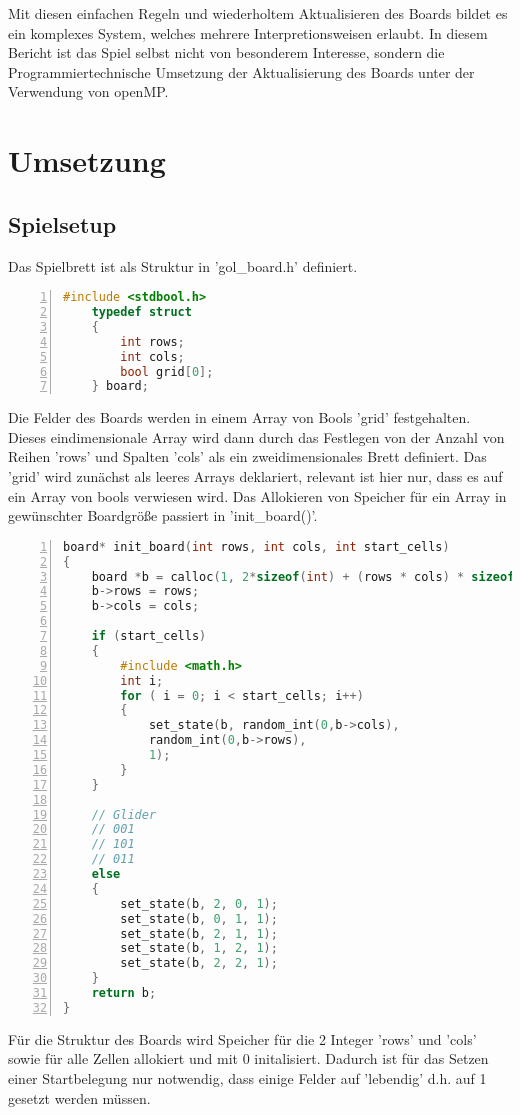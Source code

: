 \documentclass[plainarticle,zihtitle,german,final,hyperref,utf8]{zihpub}
\begin{document}
 
 Mit diesen einfachen Regeln und wiederholtem Aktualisieren des Boards bildet es ein komplexes System, welches mehrere Interpretionsweisen erlaubt.\cite{conwaysgame_wiki}\newline
 In diesem Bericht ist das Spiel selbst nicht von besonderem Interesse, sondern die Programmiertechnische Umsetzung der Aktualisierung des Boards unter der Verwendung von openMP.
 
\section{Umsetzung}
\subsection{Spielsetup}
Das Spielbrett ist als Struktur in 'gol\_board.h' definiert.
\begin{lstlisting}[language=c, numbers=left]
	#include <stdbool.h>
	typedef struct
	{
		int rows;
		int cols;
		bool grid[0];
	} board;
\end{lstlisting}
Die Felder des Boards werden in einem Array von Bools 'grid' festgehalten. Dieses eindimensionale Array wird dann durch das Festlegen von der Anzahl von Reihen 'rows' und Spalten 'cols' als ein zweidimensionales Brett definiert.\newline
Das 'grid' wird zunächst als leeres Arrays deklariert, relevant ist hier nur, dass es auf ein Array von bools verwiesen wird. Das Allokieren von Speicher für ein Array in gewünschter Boardgröße passiert in 'init\_board()'.
\begin{lstlisting}[language=c, numbers=left]
board* init_board(int rows, int cols, int start_cells) 
{
	board *b = calloc(1, 2*sizeof(int) + (rows * cols) * sizeof(bool));
	b->rows = rows;
	b->cols = cols;
	
	if (start_cells)
	{
		#include <math.h>
		int i;
		for ( i = 0; i < start_cells; i++)
		{
			set_state(b, random_int(0,b->cols),
			random_int(0,b->rows),
			1);
		}
	}
	
	// Glider
	// 001
	// 101
	// 011
	else
	{
		set_state(b, 2, 0, 1);
		set_state(b, 0, 1, 1);
		set_state(b, 2, 1, 1);
		set_state(b, 1, 2, 1);
		set_state(b, 2, 2, 1);
	}
	return b;
}
\end{lstlisting}
Für die Struktur des Boards wird Speicher für die 2 Integer 'rows' und 'cols' sowie für alle Zellen allokiert und mit 0 initalisiert. Dadurch ist für das Setzen einer Startbelegung nur notwendig, dass einige Felder auf 'lebendig' d.h. auf 1 gesetzt werden müssen.\newline
\end{document}
